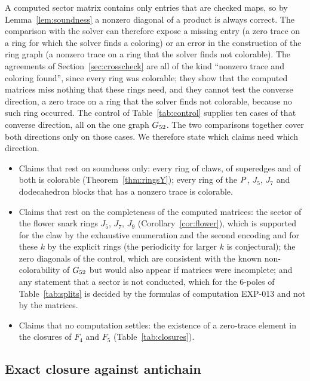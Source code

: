 A computed sector matrix contains only entries that are checked maps, so by Lemma~\ref{lem:soundness} a nonzero diagonal of a product is
always correct. The comparison with the solver can therefore expose a missing entry (a zero trace on a ring for which the solver finds a coloring) or an error in the
construction of the ring graph (a nonzero trace on a ring that the solver finds not colorable). The \nCrossRings{} agreements of Section~\ref{sec:crosscheck} are all of the kind ``nonzero trace and
coloring found'', since every ring was colorable; they show that the computed matrices miss nothing that these rings need, and they cannot test the converse
direction, a zero trace on a ring that the solver finds not colorable, because no such ring occurred. The control of Table~\ref{tab:control}
supplies ten cases of that converse direction, all on the one graph $G_{52}$. The two comparisons together cover both directions only on those cases. We therefore state
which claims need which direction.

\begin{itemize}
\item Claims that rest on soundness only: every ring of claws, of superedges and of both is colorable (Theorem~\ref{thm:ringsY}); every ring of the
$P$, $J_5$, $J_7$ and dodecahedron blocks that has a nonzero trace is colorable.
\item Claims that rest on the completeness of the computed matrices: the sector of the flower snark rings $J_5$, $J_7$, $J_9$ (Corollary~\ref{cor:flower}), which is supported for the claw by the exhaustive
enumeration and the second encoding and for these $k$ by the explicit rings (the periodicity for larger $k$ is conjectural); the zero diagonals of the control, which are consistent with the known
non-colorability of $G_{52}$ but would also appear if matrices were incomplete; and any statement that a sector is not conducted, which for the 6-poles of Table~\ref{tab:splits} is
decided by the formulas of computation EXP-013 and not by the matrices.
\item Claims that no computation settles: the existence of a zero-trace element in the closures of $F_4$ and $F_5$ (Table~\ref{tab:closures}).
\end{itemize}

\subsection{Exact closure against antichain}\label{sec:ablation-closure}

